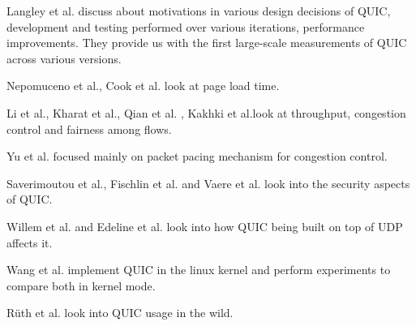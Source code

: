 \begin{frame}
\label{prior_work}
    Langley et al. \cite{DBLP:conf/sigcomm/LangleyRWVKZYKS17} discuss about motivations in various design decisions of QUIC, development and testing performed over various iterations, performance improvements. They provide us with the first large-scale measurements of QUIC across various versions.
    
    Nepomuceno et al.\cite{8538687}, Cook et al.\cite{DBLP:conf/icc/CookMTH17} look at page load time.
    
    Li et al.\cite{DBLP:conf/pam/LiCJC18}, Kharat et al.\cite{8524247}, Qian et al. \cite{DBLP:journals/access/QianWT18}, Kakhki et al.\cite{DBLP:conf/imc/KakhkiJCNM17}look at throughput, congestion control and fairness among flows.
    
    Yu et al. \cite{DBLP:conf/ipccc/YuXY17} focused mainly on packet pacing mechanism for congestion control.
    
    Saverimoutou et al.\cite{DBLP:conf/iscc/SaverimoutouMV17}, Fischlin et al.\cite{DBLP:conf/ccs/FischlinG14} and Vaere et al.\cite{DBLP:conf/imc/VaereBKT18} look into the security aspects of QUIC.
    
    Willem et al.\cite{udpgso} and Edeline et al. \cite{DBLP:journals/corr/EdelineKTAD16} look into how QUIC being built on top of UDP affects it.
    
    Wang et al.\cite{DBLP:conf/mswim/WangBRP18} implement QUIC in the linux kernel and perform experiments to compare both in kernel mode.

    Rüth et al.\cite{DBLP:conf/pam/RuthPDH18} look into QUIC usage in the wild.

    
\end{frame}
\clearpage